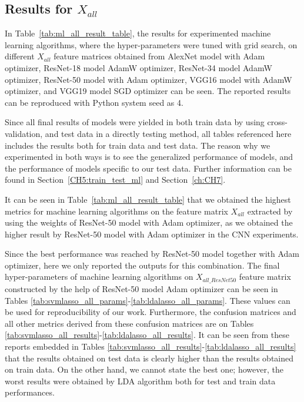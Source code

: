 \subsection{Results for $X_{all}$} \label{CH6:results_xall}

In Table~\ref{tab:ml_all_result_table}, the results for experimented machine learning algorithms, where the hyper-parameters were tuned with grid search, on different $X_{all}$ feature matrices obtained from AlexNet model with Adam optimizer, ResNet-18 model AdamW optimizer, ResNet-34 model AdamW optimizer, ResNet-50 model with Adam optimizer, VGG16 model with AdamW optimizer, and VGG19 model SGD optimizer can be seen. The reported results can be reproduced with Python system seed as 4. 

Since all final results of models were yielded in both train data by using cross-validation, and test data in a directly testing method, all tables referenced here includes the results both for train data and test data. The reason why we experimented in both ways is to see the generalized performance of models, and the performance of models specific to our test data. Further information can be found in Section~\ref{CH5:train_test_ml} and Section~\ref{ch:CH7}.

It can be seen in Table~\ref{tab:ml_all_result_table} that we obtained the highest metrics for machine learning algorithms on the feature matrix $X_{all}$ extracted by using the weights of ResNet-50 model with Adam optimizer, as we obtained the higher result by ResNet-50 model with Adam optimizer in the CNN experiments. 

Since the best performance was reached by ResNet-50 model together with Adam optimizer, here we only reported the outputs for this combination.
The final hyper-parameters of machine learning algorithms on $X_{all\_ResNet50}$ feature matrix constructed by the help of ResNet-50 model Adam optimizer can be seen in Tables \ref{tab:svmlasso_all_params}-\ref{tab:ldalasso_all_params}. These values can be used for reproducibility of our work. Furthermore, the confusion matrices and all other metrics derived from these confusion matrices are on Tables \ref{tab:svmlasso_all_results}-\ref{tab:ldalasso_all_results}.
It can be seen from these reports embedded in Tables \ref{tab:svmlasso_all_results}-\ref{tab:ldalasso_all_results} that the results obtained on test data is clearly higher than the results obtained on train data. On the other hand, we cannot state the best one; however, the worst results were obtained by LDA algorithm both for test and train data performances. 

